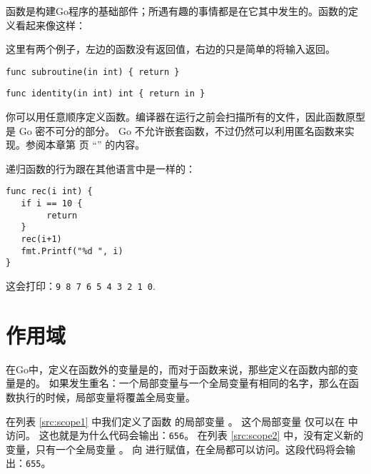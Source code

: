 
\noindent{}函数是构建Go程序的基础部件；所遇有趣的事情都是在它其中发生的。函数的定义看起来像这样：

\showremarks
这里有两个例子，左边的函数没有返回值，右边的只是简单的将输入返回。

\begin{lstlisting}
func subroutine(in int) { return }
\end{lstlisting}

\begin{lstlisting}
func identity(in int) int { return in }
\end{lstlisting}

你可以用任意顺序定义函数。编译器在运行之前会扫描所有的文件，因此函数原型是 Go 密不可分的部分。
Go 不允许嵌套函数，不过仍然可以利用匿名函数来实现。参阅本章第 \pageref{sec:functions as values} 
页 ``'' 的内容。

递归函数的行为跟在其他语言中是一样的：
\begin{lstlisting}[caption=递归函数]
func rec(i int) {
   if i == 10 {
        return
   }
   rec(i+1)
   fmt.Printf("%d ", i)
}
\end{lstlisting}
这会打印：\texttt{9 8 7 6 5 4 3 2 1 0}.
\section{作用域}
在Go中，定义在函数外的变量是的，而对于函数来说，那些定义在函数内部的变量是的。
如果发生重名：一个局部变量与一个全局变量有相同的名字，那么在函数执行的时候，局部变量将覆盖全局变量。

\begin{minipage}{.5\textwidth}

\hfill
\vfill
\end{minipage}
\hfill
\begin{minipage}{.5\textwidth}

\hfill
\vfill
\end{minipage}

在列表 \ref{src:scope1} 中我们定义了函数  的局部变量 。
这个局部变量  仅可以在  中访问。
这也就是为什么代码会输出：\texttt{656}。
在列表 \ref{src:scope2} 中，没有定义新的变量，只有一个全局变量 。
向  进行赋值，在全局都可以访问。这段代码将会输出：\texttt{655}。

